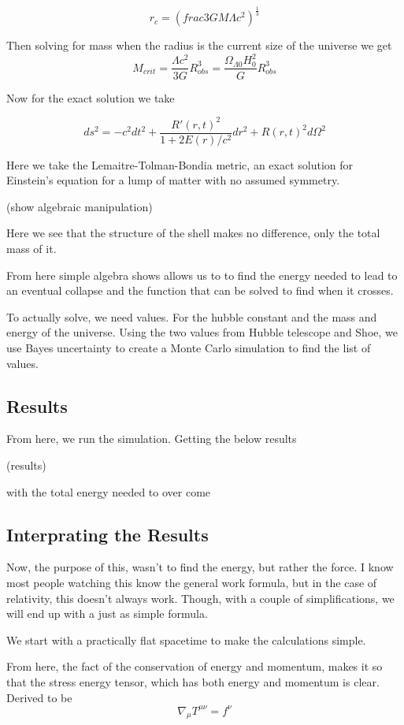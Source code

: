 \[
    r_c = \left(frac{3GM}{\Lambda c^2}   \right)^{\frac{1}{3}}
  \]

  Then solving for mass when the radius is the current size of the universe we get
\[
M_{crit} = \frac{\Lambda c^2}{3G}R^3_{obs} = \frac{\Omega_{\Lambda 0}H^2_0}{G}R^3_{obs}
  \]

  Now for the exact solution we take

\[
ds^2 = -c^2dt^2 + \frac{R'(r,t)^2}{1+2E(r)/c^2}dr^2 + R(r,t)^2 d \Omega^2
  \]

  Here we take the Lemaitre-Tolman-Bondia metric, an exact solution for Einstein's equation for a lump of matter with no assumed symmetry.

  (show algebraic manipulation)

  Here we see that the structure of the shell makes no difference, only the total mass of it.

  From here simple algebra shows allows us to to find the energy needed to lead to an eventual collapse and the function that can be solved to find when it crosses.

  To actually solve, we need values. For the hubble constant and the mass and energy of the universe. Using the two values from Hubble telescope and Shoe, we use Bayes uncertainty to create a Monte Carlo simulation to find the list of values.

\subsection{Results}

From here, we run the simulation. Getting the below results

(results)

with the total energy needed to over come

\subsection{Interprating the Results}

Now, the purpose of this, wasn't to find the energy, but rather the force. I know most people watching this know the general work formula, but in the case of relativity, this doesn't always work. Though, with a couple of simplifications, we will end up with a just as simple formula.

We start with a practically flat spacetime to make the calculations simple.

From here, the fact of the conservation of energy and momentum, makes it so that the stress energy tensor, which has both energy and momentum is clear. Derived to be
\[
\nabla_\mu T^{\mu \nu}= f^\nu
  \]

